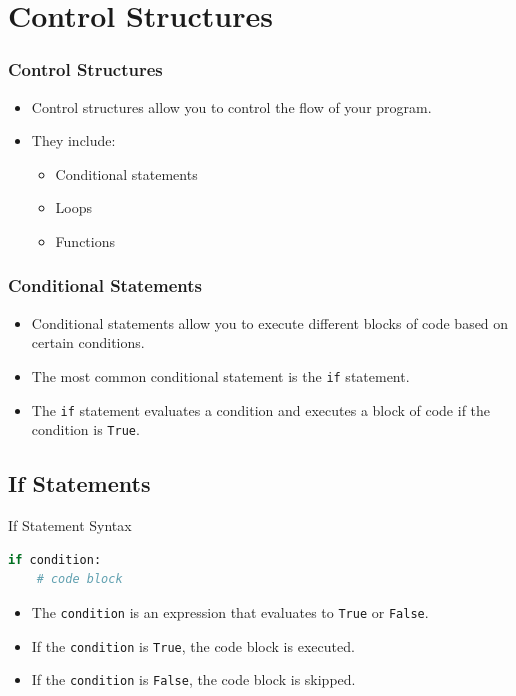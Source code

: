 
\section{Control Structures}
\begin{frame}
    \frametitle{Control Structures}
    \begin{itemize}
        \item Control structures allow you to control the flow of your program.
        \item They include:
        \begin{itemize}
            \item Conditional statements
            \item Loops
            \item Functions
        \end{itemize}
    \end{itemize}
\end{frame}
\begin{frame}
    \frametitle{Conditional Statements}
    \begin{itemize}
        \item Conditional statements allow you to execute different blocks of code based on certain conditions.
        \item The most common conditional statement is the \texttt{if} statement.
        \item The \texttt{if} statement evaluates a condition and executes a block of code if the condition is \texttt{True}.
    \end{itemize}
\end{frame}
\subsection{If Statements}
\begin{frame}[fragile]{If Statement Syntax}
    \begin{lstlisting}[language=Python]
if condition:
    # code block
    \end{lstlisting}
    \begin{itemize}
        \item The \texttt{condition} is an expression that evaluates to \texttt{True} or \texttt{False}.
        \item If the \texttt{condition} is \texttt{True}, the code block is executed.
        \item If the \texttt{condition} is \texttt{False}, the code block is skipped.
    \end{itemize}
\end{frame}

